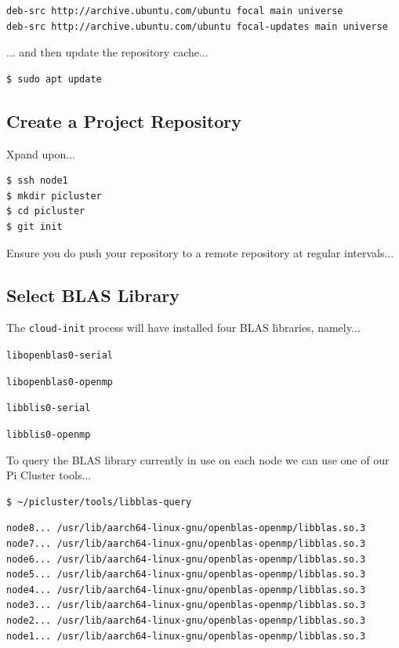 \documentclass{report}
\begin{document}
\lstset{style=listingstyle}
\begin{lstlisting}[caption=/etc/apt/sources.list.d/picluster.list]
deb-src http://archive.ubuntu.com/ubuntu focal main universe
deb-src http://archive.ubuntu.com/ubuntu focal-updates main universe
\end{lstlisting}

... and then update the repository cache...

\lstset{style=termstyle}
\begin{lstlisting}[]
$ sudo apt update
\end{lstlisting}



\subsection{Create a Project Repository}

Xpand upon...

\lstset{style=termstyle}
\begin{lstlisting}[]
$ ssh node1
$ mkdir picluster
$ cd picluster
$ git init
\end{lstlisting}

Ensure you do push your repository to a remote repository at regular intervals...


\subsection{Select BLAS Library}

The \verb|cloud-init| process will have installed four BLAS libraries, namely...

\verb|libopenblas0-serial|

\verb|libopenblas0-openmp|

\verb|libblis0-serial|

\verb|libblis0-openmp|

To query the BLAS library currently in use on each node we can use one of our Pi Cluster tools...

\lstset{style=termstyle}
\begin{lstlisting}[]
$ ~/picluster/tools/libblas-query
\end{lstlisting}

\lstset{style=termstyle}
\begin{lstlisting}[]
node8... /usr/lib/aarch64-linux-gnu/openblas-openmp/libblas.so.3
node7... /usr/lib/aarch64-linux-gnu/openblas-openmp/libblas.so.3
node6... /usr/lib/aarch64-linux-gnu/openblas-openmp/libblas.so.3
node5... /usr/lib/aarch64-linux-gnu/openblas-openmp/libblas.so.3
node4... /usr/lib/aarch64-linux-gnu/openblas-openmp/libblas.so.3
node3... /usr/lib/aarch64-linux-gnu/openblas-openmp/libblas.so.3
node2... /usr/lib/aarch64-linux-gnu/openblas-openmp/libblas.so.3
node1... /usr/lib/aarch64-linux-gnu/openblas-openmp/libblas.so.3
\end{lstlisting}
\end{document}
